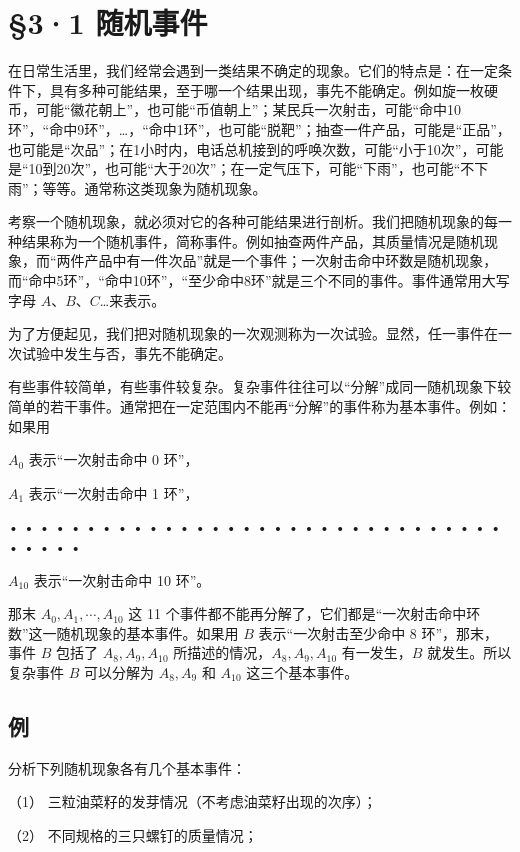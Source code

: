 \section{§3·1 随机事件}

在日常生活里，我们经常会遇到一类结果不确定的现象。它们的特点是：在一定条件下，具有多种可能结果，至于哪一个结果出现，事先不能确定。例如旋一枚硬币，可能``徽花朝上''，也可能``币值朝上''；某民兵一次射击，可能``命中10环''，``命中9环''，\ldots，``命中1环''，也可能``脱靶''；抽查一件产品，可能是``正品''，也可能是``次品''；在1小时内，电话总机接到的呼唤次数，可能``小于10次''，可能是``10到20次''，也可能``大于20次''；在一定气压下，可能``下雨''，也可能``不下雨''；等等。通常称这类现象为随机现象。

考察一个随机现象，就必须对它的各种可能结果进行剖析。我们把随机现象的每一种结果称为一个随机事件，简称事件。例如抽查两件产品，其质量情况是随机现象，而``两件产品中有一件次品''就是一个事件；一次射击命中环数是随机现象，而``命中5环''，``命中10环''，``至少命中8环''就是三个不同的事件。事件通常用大写字母
\(A\)、\(B\)、\(C\)\ldots 来表示。

为了方便起见，我们把对随机现象的一次观测称为一次试验。显然，任一事件在一次试验中发生与否，事先不能确定。

有些事件较简单，有些事件较复杂。复杂事件往往可以``分解''成同一随机现象下较简单的若干事件。通常把在一定范围内不能再``分解''的事件称为基本事件。例如：如果用

\(A_{0}\) 表示``一次射击命中 0 环''，

\(A_{1}\) 表示``一次射击命中 1 环''，

• • • • • • • • • • • • • • • • • • • • • • • • • • • • • • • • • • • •
•

\(A_{10}\) 表示``一次射击命中 10 环''。

那末 \(A_0, A_1, \cdots, A_{10}\) 这 11
个事件都不能再分解了，它们都是``一次射击命中环数''这一随机现象的基本事件。如果用
\(B\) 表示``一次射击至少命中 8 环''，那末，事件 \(B\) 包括了
\(A_8, A_9, A_{10}\) 所描述的情况，\(A_8, A_9, A_{10}\) 有一发生，\(B\)
就发生。所以复杂事件 \(B\) 可以分解为 \(A_8, A_9\) 和 \(A_{10}\)
这三个基本事件。

\subsection{例}

分析下列随机现象各有几个基本事件：

（1） 三粒油菜籽的发芽情况（不考虑油菜籽出现的次序）；

（2） 不同规格的三只螺钉的质量情况；

